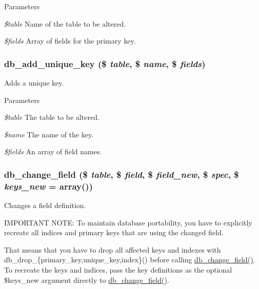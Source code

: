 \begin{DoxyParams}{Parameters}
\item[{\em \$table}]Name of the table to be altered. \item[{\em \$fields}]Array of fields for the primary key. \end{DoxyParams}
\hypertarget{group__schemaapi_gad6dd1c6f39d180bc21853ac6118a8f40}{
\subsubsection[{db\_\-add\_\-unique\_\-key}]{\setlength{\rightskip}{0pt plus 5cm}db\_\-add\_\-unique\_\-key (\$ {\em table}, \/  \$ {\em name}, \/  \$ {\em fields})}}
\label{group__schemaapi_gad6dd1c6f39d180bc21853ac6118a8f40}
Adds a unique key.


\begin{DoxyParams}{Parameters}
\item[{\em \$table}]The table to be altered. \item[{\em \$name}]The name of the key. \item[{\em \$fields}]An array of field names. \end{DoxyParams}
\hypertarget{group__schemaapi_ga9e0a4211eb8137e187d5f3f4fa716cea}{
\subsubsection[{db\_\-change\_\-field}]{\setlength{\rightskip}{0pt plus 5cm}db\_\-change\_\-field (\$ {\em table}, \/  \$ {\em field}, \/  \$ {\em field\_\-new}, \/  \$ {\em spec}, \/  \$ {\em keys\_\-new} = {\ttfamily array()})}}
\label{group__schemaapi_ga9e0a4211eb8137e187d5f3f4fa716cea}
Changes a field definition.

IMPORTANT NOTE: To maintain database portability, you have to explicitly recreate all indices and primary keys that are using the changed field.

That means that you have to drop all affected keys and indexes with db\_\-drop\_\-\{primary\_\-key,unique\_\-key,index\}() before calling \hyperlink{group__schemaapi_ga9e0a4211eb8137e187d5f3f4fa716cea}{db\_\-change\_\-field()}. To recreate the keys and indices, pass the key definitions as the optional \$keys\_\-new argument directly to \hyperlink{group__schemaapi_ga9e0a4211eb8137e187d5f3f4fa716cea}{db\_\-change\_\-field()}.

